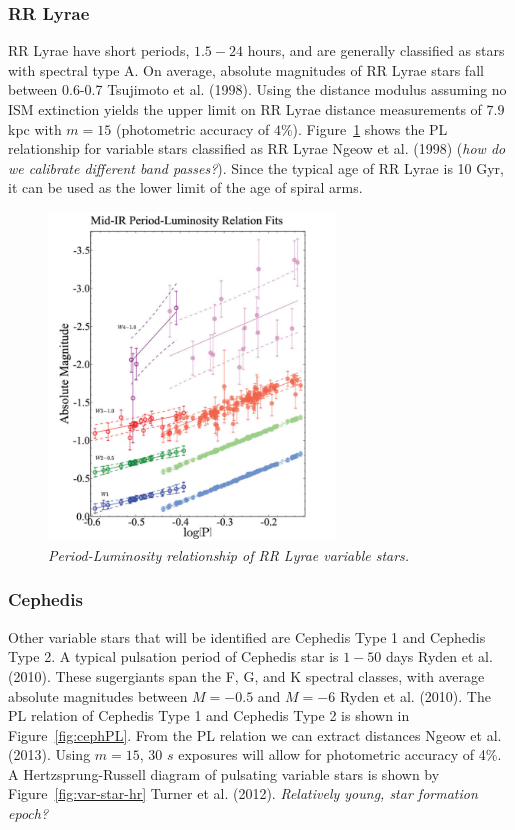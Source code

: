 \documentclass[letterpaper,11pt]{article}
\begin{document}
\subsubsection{RR Lyrae}
RR Lyrae have short periods, $1.5 - 24$ hours, and are generally classified as stars with spectral type A.  On average, absolute magnitudes of RR Lyrae stars fall between 0.6-0.7 Tsujimoto et al. (1998). Using the distance modulus assuming no ISM extinction yields the upper limit on RR Lyrae distance measurements of $7.9$ kpc with $m=15$ (photometric accuracy of $4\%$). Figure~\ref{fig:plrelationrrlyrae} shows the PL relationship for variable stars classified as RR Lyrae Ngeow et al. (1998) (\textit{how do we calibrate different band passes?}). Since the typical age of RR Lyrae is 10 Gyr, it can be used as the lower limit of the age of spiral arms.  
\begin{figure}[H]%
  \begin{center}
\centerline{\includegraphics[width=3in]{figures/PL_relation}}
\caption{\it \small{Period-Luminosity relationship of RR Lyrae variable stars. \label{fig:plrelationrrlyrae}}}
  \end{center}
\end{figure}


\subsubsection{Cephedis}

Other variable stars that will be identified are Cephedis Type 1 and Cephedis Type 2.  A typical pulsation period of Cephedis star is $1 - 50$ days Ryden et al. (2010).  These sugergiants span the F, G, and K spectral classes, with average absolute magnitudes between $M=-0.5$ and $M=-6$ Ryden et al. (2010).  The PL relation of Cephedis Type 1 and Cephedis Type 2 is shown in Figure~\ref{fig:cephPL}. From the PL relation we can extract distances Ngeow et al. (2013). Using $m=15$, 30 $s$ exposures will allow for photometric accuracy of 4\%.  A Hertzsprung-Russell diagram of pulsating variable stars is shown by Figure~\ref{fig:var-star-hr} Turner et al. (2012). \textit{Relatively young, star formation epoch?}
\end{document}
